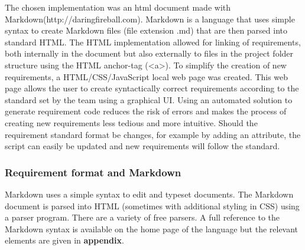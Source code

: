 The chosen implementation was an html document made with
Markdown(http://daringfireball.com). Markdown is a language that uses simple
syntax to create Markdown files (file extension .md) that are then parsed
into standard HTML. The HTML implementation allowed for linking of requirements,
both internally in the document but also externally to files in the project
folder structure using the HTML anchor-tag (<a>). To simplify the creation of
new requirements, a HTML/CSS/JavaScript local web page was created. This web
page allows the user to create syntactically correct requirements according to
the standard set by the team using a graphical UI. Using an automated solution
to generate requirement code reduces the risk of errors and makes the process of
creating new requirements less tedious and more intuitive. Should the
requirement standard format be changes, for example by adding an attribute, the
script can easily be updated and new requirements will follow the standard.

\subsubsection{Requirement format and Markdown}
Markdown uses a simple syntax to edit and typeset documents. The Markdown
document is parsed into HTML (sometimes with additional styling in CSS) using a
parser program. There are a variety of free parsers. A full reference to the
Markdown syntax is available on the home page of the language but the relevant
elements are given in {\bf appendix}. %

